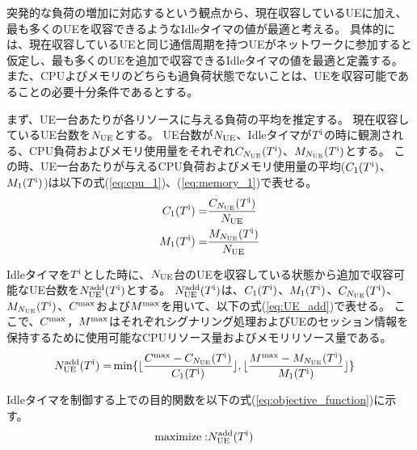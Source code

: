 \documentclass[a4j]{ujarticle}
\begin{document}
突発的な負荷の増加に対応するという観点から、現在収容しているUEに加え、最も多くのUEを収容できるようなIdleタイマの値が最適と考える。
具体的には、現在収容しているUEと同じ通信周期を持つUEがネットワークに参加すると仮定し、最も多くのUEを追加で収容できるIdleタイマの値を最適と定義する。
また、CPUよびメモリのどちらも過負荷状態でないことは、UEを収容可能であることの必要十分条件であるとする。

まず、UE一台あたりが各リソースに与える負荷の平均を推定する。
現在収容しているUE台数を$N_{\rm UE}$とする。
UE台数が$N_{\rm UE}$、Idleタイマが$T^{\rm i}$の時に観測される、CPU負荷およびメモリ使用量をそれぞれ$C_{N_{\rm UE}}(T^{\rm i})$、$M_{N_{\rm UE}}(T^{\rm i})$とする。
この時、UE一台あたりが与えるCPU負荷およびメモリ使用量の平均($C_{1}(T^{\rm i})$、$M_{1}(T^{\rm i})$)は以下の式(\ref{eq:cpu_1})、(\ref{eq:memory_1})で表せる。
\begin{eqnarray}
   C_{1}(T^{\rm i}) =& \frac{C_{N_{\rm UE}}(T^{\rm i})}{N_{\rm UE}}\label{eq:cpu_1}\\
   M_{1}(T^{\rm i}) =& \frac{M_{N_{\rm UE}}(T^{\rm i})}{N_{\rm UE}}\label{eq:memory_1}
\end{eqnarray}

Idleタイマを$T^{\rm i}$とした時に、$N_{\rm UE}$台のUEを収容している状態から追加で収容可能なUE台数を$N_{\rm UE}^{\rm add}(T^{\rm i})$とする。
$N_{\rm UE}^{\rm add}(T^{\rm i})$は、$C_{1}(T^{\rm i})$、$M_{1}(T^{\rm i})$、$C_{N_{\rm UE}}(T^{\rm i})$、$M_{N_{\rm UE}}(T^{\rm i})$、$C^{\rm max}$および$M^{\rm max}$を用いて、以下の式(\ref{eq:UE_add})で表せる。
ここで、$C^{\rm max}$，$M^{\rm max}$はそれぞれシグナリング処理およびUEのセッション情報を保持するために使用可能なCPUリソース量およびメモリリソース量である。
\begin{eqnarray}
   N_{\rm UE}^{\rm add}(T^{\rm i}) =& \min \{\lfloor \frac{C^{\rm max} - C_{N_{\rm UE}}(T^{\rm i})}{C_{1}(T^{\rm i})} \rfloor, \lfloor \frac{M^{\rm max} - M_{N_{\rm UE}}(T^{\rm i})}{M_{1}(T^{\rm i})} \rfloor\} \label{eq:UE_add}
\end{eqnarray}

Idleタイマを制御する上での目的関数を以下の式(\ref{eq:objective_function})に示す。
\begin{eqnarray}
  \text{maximize} :& N_{\rm UE}^{\rm add}(T^{\rm i})
  \label{eq:objective_function}
\end{eqnarray}
\end{document}
